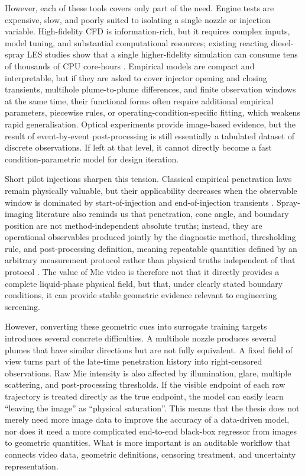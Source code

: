 \documentclass[english, 12pt, a4paper, elec, utf8, a-2b, online]{aaltothesis}
\begin{document}
However, each of these tools covers only part of the need. 
Engine tests are expensive, slow, and poorly suited to isolating a single nozzle or injection variable. 
High-fidelity CFD is information-rich, but it requires complex inputs, model tuning, and substantial computational resources; 
existing reacting diesel-spray LES studies show that a single higher-fidelity simulation can consume tens of thousands of CPU core-hours 
\cite{CurtisNiemeyerSung2017,liu2020sprayreview}. 
Empirical models are compact and interpretable, but if they are asked to cover injector opening and closing transients, 
multihole plume-to-plume differences, and finite observation windows at the same time, 
their functional forms often require additional empirical parameters, piecewise rules, or operating-condition-specific fitting, 
which weakens rapid generalisation. 
Optical experiments provide image-based evidence, 
but the result of event-by-event post-processing is still essentially a tabulated dataset of discrete observations. 
If left at that level, it cannot directly become a fast condition-parametric model for design iteration.

Short pilot injections sharpen this tension. 
Classical empirical penetration laws remain physically valuable, 
but their applicability decreases when the observable window is dominated by start-of-injection and end-of-injection transients 
\cite{HiroyasuArai1990,ZhouLiYi2021,ZhouLiLaiWei2019}. 
Spray-imaging literature also reminds us that penetration, cone angle, and boundary position are not method-independent absolute truths; 
instead, they are operational observables produced jointly by the diagnostic method, thresholding rule, and post-processing definition, 
meaning repeatable quantities defined by an arbitrary measurement protocol 
rather than physical truths independent of that protocol 
\cite{MagnottiGenzale2013,JohnsonNaberLee2012,ecn_liquid_penetration,ecn_liquid_penetration_accessory}. 
The value of Mie video is therefore not that it directly provides a complete liquid-phase physical field, 
but that, under clearly stated boundary conditions, 
it can provide stable geometric evidence relevant to engineering screening.

However, converting these geometric cues into surrogate training targets introduces several concrete difficulties. 
A multihole nozzle produces several plumes that have similar directions but are not fully equivalent. 
A fixed field of view turns part of the late-time penetration history into right-censored observations. 
Raw Mie intensity is also affected by illumination, glare, multiple scattering, and post-processing thresholds. 
If the visible endpoint of each raw trajectory is treated directly as the true endpoint, the model can easily learn ``leaving the image'' 
as ``physical saturation''. 
This means that the thesis does not merely need more image data to improve the accuracy of a data-driven model, 
nor does it need a more complicated end-to-end black-box regressor from images to geometric quantities. 
What is more important is an auditable workflow that connects video data, geometric definitions, censoring treatment, and uncertainty representation.
\end{document}
